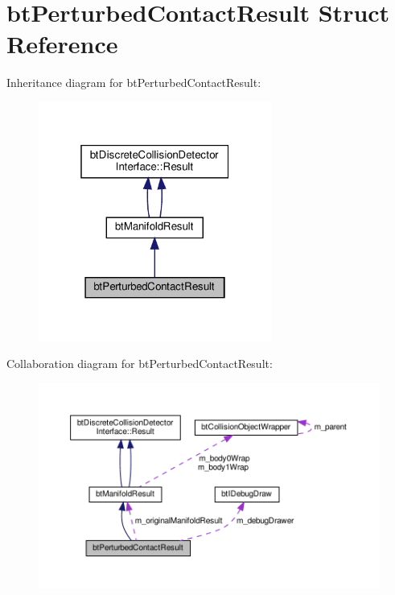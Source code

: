 \hypertarget{structbtPerturbedContactResult}{}\section{bt\+Perturbed\+Contact\+Result Struct Reference}
\label{structbtPerturbedContactResult}


Inheritance diagram for bt\+Perturbed\+Contact\+Result\+:
\nopagebreak
\begin{figure}[H]
\begin{center}
\leavevmode
\includegraphics[width=217pt]{structbtPerturbedContactResult__inherit__graph}
\end{center}
\end{figure}


Collaboration diagram for bt\+Perturbed\+Contact\+Result\+:
\nopagebreak
\begin{figure}[H]
\begin{center}
\leavevmode
\includegraphics[width=350pt]{structbtPerturbedContactResult__coll__graph}
\end{center}
\end{figure}
